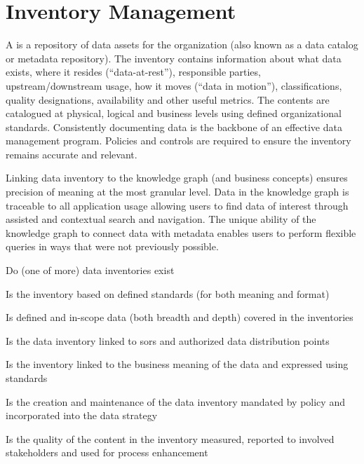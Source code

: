 \section{Inventory Management}\label{sec:ekgmm-b-2-3} %

A  is a repository of data assets for the organization (also known as a
data catalog or metadata repository).
The inventory contains information about what data exists, where it resides (“data-at-rest”),
responsible parties, upstream/downstream usage, how it moves (“data in motion”), classifications,
quality designations, availability and other useful metrics.
The contents are catalogued at physical, logical and business levels using defined organizational standards.
Consistently documenting data is the backbone of an effective data management program.
Policies and controls are required to ensure the inventory remains accurate and relevant.

\kgmmekgrationalesection

Linking data inventory to the knowledge graph (and business concepts) ensures precision of meaning at the most
granular level.
Data in the knowledge graph is traceable to all application usage allowing users to find data of interest through
assisted and contextual search and navigation.
The unique ability of the knowledge graph to connect data with metadata enables users to perform flexible queries
in ways that were not previously possible.

\kgmmcorequestionssection

\begin{core-questions}

  \item [\thesection.1] Do (one of more) data inventories exist
  \item [\thesection.2] Is the inventory based on defined standards (for both meaning and format)
  \item [\thesection.3] Is defined and in-scope data (both breadth and depth) covered in the inventories
  \item [\thesection.4] Is the data inventory linked to \glspl{sor} and authorized data distribution points
  \item [\thesection.5] Is the inventory linked to the business meaning of the data and expressed using standards
  \item [\thesection.6] Is the creation and maintenance of the data inventory mandated by policy and incorporated
                        into the data strategy
  \item [\thesection.7] Is the quality of the content in the inventory measured, reported to involved stakeholders
                        and used for process enhancement

\end{core-questions}


